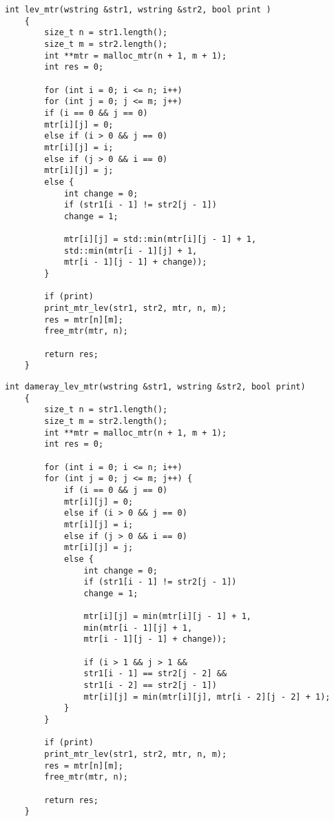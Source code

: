 \begin{lstlisting}[label=lst:lev_mtr,caption=Функция нахождения расстояния Левенштейна с использованием матрицы]
	int lev_mtr(wstring &str1, wstring &str2, bool print )
	{
		size_t n = str1.length();
		size_t m = str2.length();
		int **mtr = malloc_mtr(n + 1, m + 1);
		int res = 0;
		
		for (int i = 0; i <= n; i++)
		for (int j = 0; j <= m; j++)
		if (i == 0 && j == 0)
		mtr[i][j] = 0;
		else if (i > 0 && j == 0)
		mtr[i][j] = i;
		else if (j > 0 && i == 0)
		mtr[i][j] = j;
		else {
			int change = 0;
			if (str1[i - 1] != str2[j - 1])
			change = 1;
			
			mtr[i][j] = std::min(mtr[i][j - 1] + 1,
			std::min(mtr[i - 1][j] + 1,
			mtr[i - 1][j - 1] + change));
		}
		
		if (print)
		print_mtr_lev(str1, str2, mtr, n, m);
		res = mtr[n][m];
		free_mtr(mtr, n);
		
		return res;
	}
\end{lstlisting}

\clearpage

\begin{lstlisting}[label=lst:dameray_lev_rec,caption=Функция нахождения расстояния Дамерау-Левенштейна с использованием матрицы]
	int dameray_lev_mtr(wstring &str1, wstring &str2, bool print)
	{
		size_t n = str1.length();
		size_t m = str2.length();
		int **mtr = malloc_mtr(n + 1, m + 1);
		int res = 0;
		
		for (int i = 0; i <= n; i++)
		for (int j = 0; j <= m; j++) {
			if (i == 0 && j == 0)
			mtr[i][j] = 0;
			else if (i > 0 && j == 0)
			mtr[i][j] = i;
			else if (j > 0 && i == 0)
			mtr[i][j] = j;
			else {
				int change = 0;
				if (str1[i - 1] != str2[j - 1])
				change = 1;
				
				mtr[i][j] = min(mtr[i][j - 1] + 1,
				min(mtr[i - 1][j] + 1,
				mtr[i - 1][j - 1] + change));
				
				if (i > 1 && j > 1 &&
				str1[i - 1] == str2[j - 2] &&
				str1[i - 2] == str2[j - 1])
				mtr[i][j] = min(mtr[i][j], mtr[i - 2][j - 2] + 1);
			}
		}
		
		if (print)
		print_mtr_lev(str1, str2, mtr, n, m);
		res = mtr[n][m];
		free_mtr(mtr, n);
		
		return res;
	}
\end{lstlisting}

\clearpage

